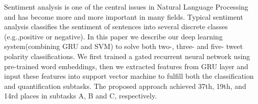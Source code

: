 Sentiment analysis is one of the central issues in Natural Language Processing and has become more and more important in many fields. Typical sentiment analysis classifies the sentiment of sentences into several discrete classes (e.g.,positive or negative). In this paper we describe our deep learning system(combining GRU and SVM) to solve both two-, three- and five- tweet polarity classifications. We first trained a gated recurrent neural network using pre-trained word embeddings, then we extracted features from GRU layer and input these features into support vector machine to fulfill both the classification and quantification subtasks. The proposed approach achieved 37th, 19th, and 14rd places in subtasks A, B and C, respectively.
